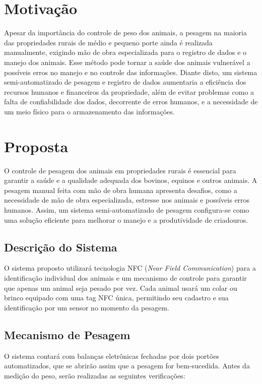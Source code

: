 \documentclass[11pt]{article}
\begin{document}
\section{Motivação}
Apesar da importância do controle de peso dos animais, a pesagem na maioria das propriedades rurais de médio e pequeno porte ainda é realizada manualmente, exigindo mão de obra especializada para o registro de dados e o manejo dos animais. Esse método pode tornar a saúde dos animais vulnerável a possíveis erros no manejo e no controle das informações. Diante disto, um sistema semi-automatizado de pesagem e registro de dados aumentaria a eficiência dos recursos humanos e financeiros da propriedade, além de evitar problemas como a falta de confiabilidade dos dados, decorrente de erros humanos, e a necessidade de um meio físico para o armazenamento das informações.

\section{Proposta}
O controle de pesagem dos animais em propriedades rurais é essencial para garantir a saúde e a qualidade adequada dos bovinos, equinos e outros animais. A pesagem manual feita com mão de obra humana apresenta desafios, como a necessidade de mão de obra especializada, estresse nos animais e possíveis erros humanos. Assim, um sistema semi-automatizado de pesagem configura-se como uma solução eficiente para melhorar o manejo e a produtividade de criadouros.

\subsection{Descrição do Sistema}
O sistema proposto utilizará tecnologia NFC (\textit{Near Field Communication}) para a identificação individual dos animais e um mecanismo de controle para garantir que apenas um animal seja pesado por vez. Cada animal usará um colar ou brinco equipado com uma tag NFC única, permitindo seu cadastro e sua identificação por um sensor no momento da pesagem.

\subsection{Mecanismo de Pesagem}
O sistema contará com balanças eletrônicas fechadas por dois portões automatizados, que se abrirão assim que a pesagem for bem-sucedida. Antes da medição do peso, serão realizadas as seguintes verificações:
\end{document}
